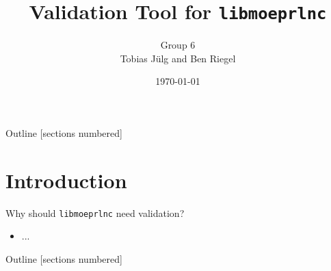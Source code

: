 \documentclass[t]{beamer} %
\title{Validation Tool for \texttt{libmoeprlnc}}
\date{\today}
\author{Group 6\\Tobias Jülg and Ben Riegel}
\institute[TUM]{Technical University of Munich}
\begin{document}
\maketitle




\begin{frame}{Outline}
  [sections numbered]
  \tableofcontents %
\end{frame}


\section{Introduction}
\begin{frame}{Why should \texttt{libmoeprlnc} need validation?}
  \begin{itemize}
    \item ...
  \end{itemize}
\end{frame}

\begin{frame}{Outline}
  [sections numbered]
  \tableofcontents %
\end{frame}
\end{document}
